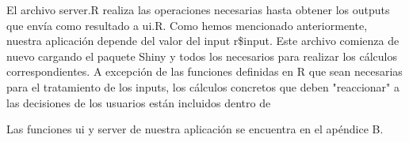 El archivo server.R realiza las operaciones necesarias hasta obtener los outputs que envía como resultado a ui.R. Como hemos mencionado anteriormente, nuestra aplicación depende del valor del input r\$input. Este archivo comienza de nuevo cargando el paquete Shiny y todos los necesarios para realizar los cálculos correspondientes. A excepción de las funciones definidas en R que sean necesarias para el tratamiento de los inputs, los cálculos concretos que deben "reaccionar" a las decisiones de los usuarios están incluidos dentro de  


Las funciones ui y server de nuestra aplicación se encuentra en el apéndice B.


